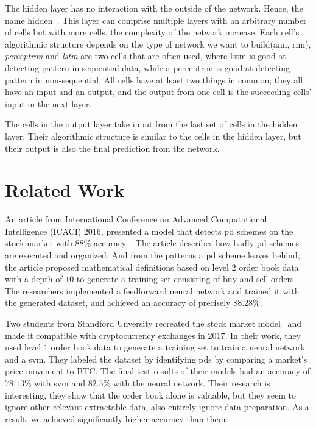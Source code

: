 The hidden layer has no interaction with the outside of the network. Hence, the name hidden~\cite{data_science, stanford}. This layer can comprise multiple layers with an arbitrary number of cells but with more cells, the complexity of the network increase. Each cell's algorithmic structure depends on the type of network we want to build(\ac{ann}, \ac{rnn}), \emph{perceptron} and \emph{lstm} are two cells that are often used, where \ac{lstm} is good at detecting pattern in sequential data, while a perceptron is good at detecting pattern in non-sequential. All cells have at least two things in common; they all have an input and an output, and the output from one cell is the succeeding cells' input in the next layer. 

The cells in the output layer take input from the last set of cells in the hidden layer. Their algorithmic structure is similar to the cells in the hidden layer, but their output is also the final prediction from the network.

\section{Related Work}\label{sec:related_work}
An article from International Conference on Advanced Computational Intelligence (ICACI) 2016, presented a model that detects \ac{pd} schemes on the stock market with $88\%$ accuracy~\cite{P&D_stock_price_manipulation}. The article describes how badly \ac{pd} schemes are executed and organized. And from the patterns a \ac{pd} scheme leaves behind, the article proposed mathematical definitions based on level $2$ order book data with a depth of $10$ to generate a training set consisting of buy and sell orders. The researchers implemented a feedforward neural network and trained it with the generated dataset, and achieved an accuracy of precisely $88.28\%$. 

Two students from Standford Unversity recreated the stock market model~\cite{P&D_stock_price_manipulation} and made it compatible with cryptocurrency exchanges in 2017. In their work, they used level $1$ order book data to generate a training set to train a neural network and a \ac{svm}. They labeled the dataset by identifying \acp{pd} by comparing a market's price movement to BTC. The final test results of their models had an accuracy of $78.13\%$ with \ac{svm} and $82.5$\% with the neural network. Their research is interesting, they show that the order book alone is valuable, but they seem to ignore other relevant extractable data, also entirely ignore data preparation. As a result, we achieved significantly higher accuracy than them.

